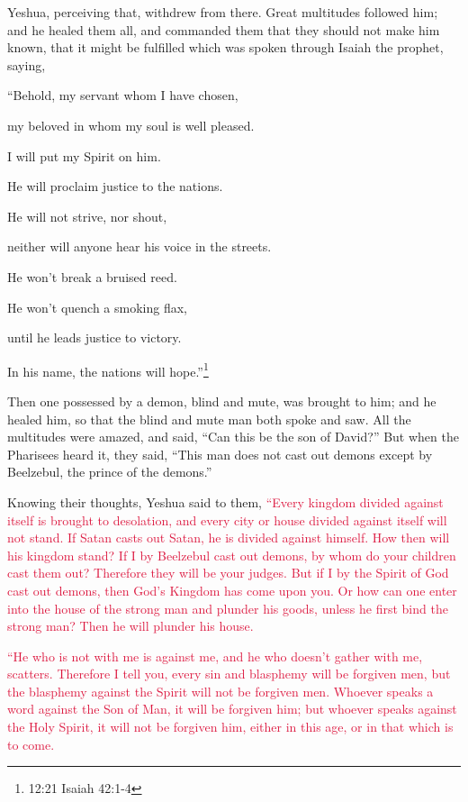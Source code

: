 \myverse{}Yeshua, perceiving that, withdrew from there. Great multitudes
followed him; and he healed them all,
\myverse{}and commanded them that they should not make him known,
\myverse{}that it might be fulfilled which was spoken through Isaiah the prophet, saying,

\myverse{}“Behold, my servant whom I have chosen,

my beloved in whom my soul is well pleased.

I will put my Spirit on him.

He will proclaim justice to the nations.

\myverse{}He will not strive, nor shout,

neither will anyone hear his voice in the streets.

\myverse{}He won’t break a bruised reed.

He won’t quench a smoking flax,

until he leads justice to victory.

\myverse{}In his name, the nations will hope.”\footnote{12:21 Isaiah 42:1-4}

\myverse{}Then one possessed by a demon, blind and mute, was brought to
him; and he healed him, so that the blind and mute man both spoke and saw.
\myverse{}All the multitudes were amazed, and said, “Can this be the son of David?”
\myverse{}But when the Pharisees heard it, they said, “This man does not cast out demons
except by Beelzebul, the prince of the demons.”

\myverse{}Knowing their thoughts, Yeshua said to them,
\textcolor{crimson}{“Every kingdom divided against itself is brought to desolation, and every city or house divided against
	itself will not stand.
}
\myverse{}\textcolor{crimson}{If Satan casts out Satan, he is divided against himself. How then will
	his kingdom stand?
}
\myverse{}\textcolor{crimson}{If I by Beelzebul cast out demons, by whom do your children cast them
	out? Therefore they will be your judges.
}
\myverse{}\textcolor{crimson}{But if I by the Spirit of God cast out demons, then God’s Kingdom has
	come upon you.
}
\myverse{}\textcolor{crimson}{Or how can one enter into the house of the strong man and plunder his
	goods, unless he first bind the strong man? Then he will plunder his house.}

\myverse{}\textcolor{crimson}{“He who is not with me is against me, and he who doesn’t
	gather with me, scatters.
}
\myverse{}\textcolor{crimson}{Therefore I tell you, every sin and blasphemy will be forgiven men, but
	the blasphemy against the Spirit will not be forgiven men.
}
\myverse{}\textcolor{crimson}{Whoever speaks a word against the Son of Man, it will be forgiven him;
	but whoever speaks against the Holy Spirit, it will not be forgiven him, either in this age, or in that
	which is to come.}

